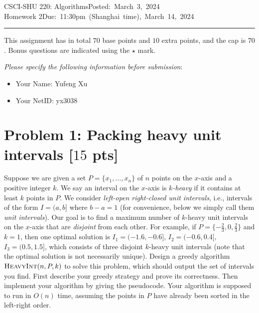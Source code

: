 \documentclass[11pt,twoside]{article}
\newcommand{\homework}[1]{
   \pagestyle{myheadings}
   \thispagestyle{plain}
   \newpage
   \setcounter{page}{1}
   \noindent
   \classname \hfill \mbox{\updatedday} \\
   \instname \hfill \mbox{\duedate}
   \rule{6.5in}{0.5mm}
   \vspace*{-0.1 in}
}
\newcommand{\problem}[1]{\section*{Problem #1}}
\def\classname{CSCI-SHU 220: Algorithms}
\def\updatedday{Posted: March 3, 2024}
\def\duedate{Due: 11:30pm (Shanghai time), March 14, 2024}
\def\instname{Homework 2}
\begin{document}
\homework{1}

This assignment has in total $70$ base points and $10$ extra points, and the cap is $70$.
Bonus questions are indicated using the $\star$ mark.

\textit{Please specify the following information before submission}:
\begin{itemize}
    \item Your Name: Yufeng Xu%
    \item Your NetID: yx3038%
\end{itemize}

\problem{1: Packing heavy unit intervals [$15$ pts]}

Suppose we are given a set $P = \{x_1,\dots,x_n\}$ of $n$ points on the $x$-axis and a positive integer $k$.
We say an interval on the $x$-axis is \textit{$k$-heavy} if it contains at least $k$ points in $P$.
We consider \textit{left-open right-closed unit intervals}, i.e., intervals of the form $I = (a,b]$ where $b-a = 1$ (for convenience, below we simply call them \textit{unit intervals}).
Our goal is to find a maximum number of $k$-heavy unit intervals on the $x$-axis that are \textit{disjoint} from each other.
For example, if $P = \{-\frac{2}{3},0,\frac{2}{3}\}$ and $k = 1$, then one optimal solution is $I_1 = (-1.6,-0.6]$, $I_2 = (-0.6,0.4]$, $I_3 = (0.5,1.5]$, which consists of three disjoint $k$-heavy unit intervals (note that the optimal solution is not necessarily unique).
Design a greedy algorithm $\textsc{HeavyInt}(n,P,k)$ to solve this problem, which should output the set of intervals you find.
First describe your greedy strategy and prove its correctness.
Then implement your algorithm by giving the pseudocode.
Your algorithm is supposed to run in $O(n)$ time, assuming the points in $P$ have already been sorted in the left-right order.
\end{document}
